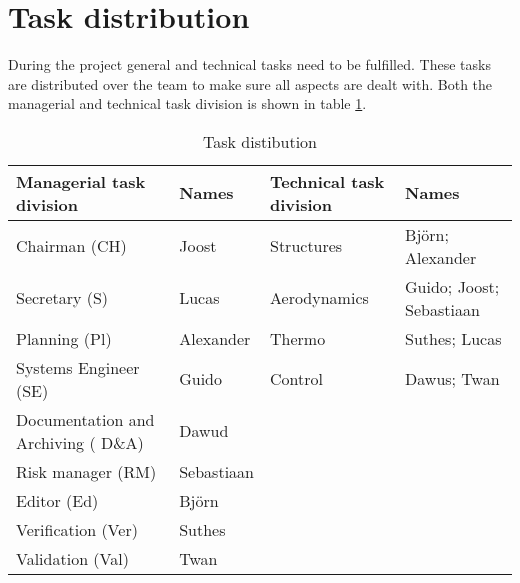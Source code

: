 \section{Task distribution}
During the project general and technical tasks need to be fulfilled. These tasks are distributed over the team to make sure all aspects are dealt with. Both the managerial and technical task division is shown in table \ref{tab:taskdist}.

\begin{table}[H]
	\caption {Task distibution}
    \begin{tabular}{|p{}|p{}|p{}|p{}|}
    \hline
    Managerial task division                 & Names      & Technical task division & Names                    \\ \hline \hline
    Chairman (CH)                         & Joost      & Structures              & Bj\"{o}rn; Alexander         \\ \hline
    Secretary (S)                         & Lucas      & Aerodynamics            & Guido; Joost; Sebastiaan \\ \hline
    Planning (Pl)                         & Alexander  & Thermo                  & Suthes; Lucas            \\ \hline
    Systems Engineer (SE)                 & Guido      & Control                 & Dawus; Twan              \\ \hline
    Documentation and Archiving ( D\&A) & Dawud      & ~                       & ~                        \\ \hline
    Risk manager (RM)                   & Sebastiaan & ~                       & ~                        \\ \hline
    Editor (Ed)                           & Bj\"{o}rn      & ~                       & ~                        \\ \hline
    Verification (Ver)                    & Suthes     & ~                       & ~                        \\ \hline
    Validation (Val)                      & Twan       & ~                       & ~                        \\ \hline
    \end{tabular}
    \label{tab:taskdist}
\end{table}
